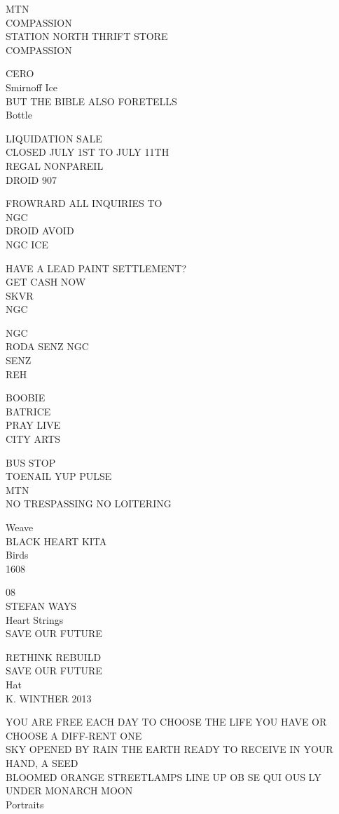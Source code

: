 \documentclass[10pt,letterpaper]{article}
\begin{document}
MTN\\
COMPASSION\\
STATION NORTH THRIFT STORE\\
COMPASSION

CERO\\
Smirnoff Ice\\
BUT THE BIBLE ALSO FORETELLS\\
Bottle

LIQUIDATION SALE\\
CLOSED JULY 1ST TO JULY 11TH\\
REGAL NONPAREIL\\
DROID 907

FROWRARD ALL INQUIRIES TO\\
NGC\\
DROID AVOID\\
NGC ICE

HAVE A LEAD PAINT SETTLEMENT?\\
GET CASH NOW\\
SKVR\\
NGC

NGC\\
RODA SENZ NGC\\
SENZ\\
REH

BOOBIE\\
BATRICE\\
PRAY LIVE\\
CITY ARTS

BUS STOP\\
TOENAIL YUP PULSE\\
MTN\\
NO TRESPASSING NO LOITERING

Weave\\
BLACK HEART KITA\\
Birds\\
1608

08\\
STEFAN WAYS\\
Heart Strings\\
SAVE OUR FUTURE

RETHINK REBUILD\\
SAVE OUR FUTURE\\
Hat\\
K. WINTHER 2013

YOU ARE FREE EACH DAY TO CHOOSE THE LIFE YOU HAVE OR CHOOSE A DIFF{-}RENT ONE\\
SKY OPENED BY RAIN THE EARTH READY TO RECEIVE IN YOUR HAND, A SEED\\
BLOOMED ORANGE STREETLAMPS LINE UP OB SE QUI OUS LY UNDER MONARCH MOON\\
Portraits
\end{document}
